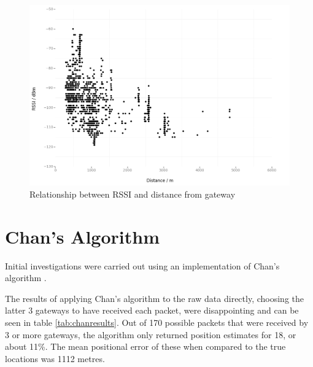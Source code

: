 \documentclass[a4paper]{report}
\begin{document}
    \begin{figure}[ht]
    \centering
    \includegraphics[width=15cm]{figures/rssidistance.png}
    \caption{Relationship between RSSI and distance from gateway}
    \label{fig:rssidistance}
    \end{figure}



  \section{Chan's Algorithm}

    Initial investigations were carried out using an implementation of Chan's algorithm \cite{Chan1994}.

    The results of applying Chan's algorithm to the raw data directly, choosing the latter 3 gateways to have received each packet, were disappointing and can be seen in table \ref{tab:chanresults}. Out of 170 possible packets that were received by 3 or more gateways, the algorithm only returned position estimates for 18, or about 11\%. The mean positional error of these when compared to the true locations was 1112 metres.
\end{document}
